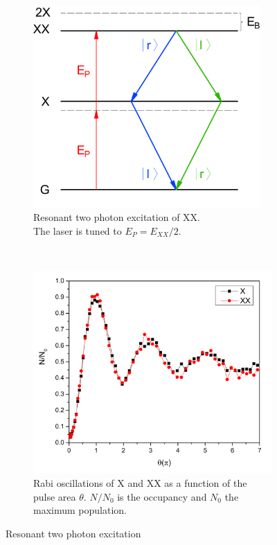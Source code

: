 \begin{figure}[H]
	\centering
	\begin{subfigure}[b]{0.48\textwidth}
		\centering
		\includegraphics[width=0.95\textwidth]{figures/quantum-dot/QD_Resonant.pdf}
		\caption{Resonant two photon excitation of \ac{XX}.\\
			The laser is tuned to $E_P = E_{XX} / 2$.}
		\label{fig:qd-resonant}
	\end{subfigure}%
	~ %
	\begin{subfigure}[b]{0.48\textwidth}
		\centering
		\includegraphics[width=\textwidth]{figures/quantum-dot/Rabi_Oscillations_rel.png}
		\caption{Rabi oscillations of \ac{X} and \ac{XX} as a function of the pulse area $\theta$.
				$N/N_0$ is the occupancy and $N_0$ the maximum population.}
		\label{fig:rabi-oscillations}
	\end{subfigure}
	\caption{Resonant two photon excitation~\cite{schimpf_towards_2017}}
	\label{fig:resonant-two-photon-excitation}
\end{figure}
